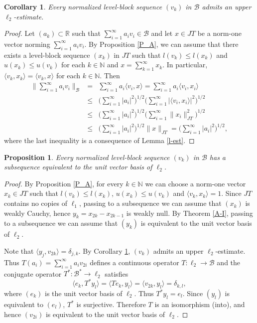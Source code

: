 \documentclass[12pt]{amsart}
\theoremstyle{plain}
\numberwithin{equation}{section}
\newcommand{\N}{\mathbb{N}}
\newcommand{\R}{\mathbb{R}}
\newcommand{\B}{\mathcal{B}}
\newtheorem{proposition}[theorem]{Proposition}
\newtheorem{corollary}[theorem]{Corollary}
\begin{document}
\begin{corollary}\label{u-est}
Every normalized level-block sequence $(v_k)$ in $\B$ admits an upper $\ell_2$-estimate.
\end{corollary}
\begin{proof}
Let $(a_k)\subset \R$ such that $\sum_{i=1}^\infty a_i v_i\in\B$ and let $x\in JT$ be a norm-one vector norming $\sum_{i=1}^\infty a_i v_i$.
By Proposition \ref{P_A}, we can assume that there exists a level-block sequence $(x_k)$ in $JT$ such that $l(v_k)\leq l(x_k)$ and $u(x_k)\leq u(v_k)$ for each $k\in\N$ and $x=\sum_{k=1}^\infty x_k$. In particular, $\langle v_k,x_k\rangle= \langle v_k,x\rangle$ for each $k\in\N$. Then
\begin{eqnarray*}
\Big\|\sum_{i=1}^\infty a_i v_i\Big\|_\B &=&
\sum_{i=1}^\infty a_i \langle v_i,x\rangle=
\sum_{i=1}^\infty a_i \langle v_i,x_i\rangle\\
&\leq&
\Big(\sum_{i=1}^\infty |a_i|^2\Big)^{1/2} \Big(\sum_{i=1}^\infty |\langle v_i,x_i \rangle|^2\Big)^{1/2}\\
&\leq& \Big(\sum_{i=1}^\infty |a_i|^2\Big)^{1/2} \Big(\sum_{i=1}^\infty
\| x_i\|_{JT}^2\Big)^{1/2}\\
&\leq& \Big(\sum_{i=1}^\infty |a_i|^2\Big)^{1/2} \|x\|_{JT} = \Big(\sum_{i=1}^\infty |a_i|^2\Big)^{1/2},
\end{eqnarray*}
where the last inequality is a consequence of Lemma \ref{l-est}.
\end{proof}

\begin{proposition}\label{l2inB}
Every normalized level-block sequence $(v_k)$ in $\B$ has a subsequence equivalent to the unit vector basis of $\ell_2$.
\end{proposition}
\begin{proof}
By Proposition \ref{P_A}, for every $k\in\N$ we can choose a norm-one vector $x_k\in JT$ such that $l(v_k)\leq l(x_k)$, $u(x_k)\leq u(v_k)$ and $\langle v_k,x_k\rangle=1$. Since $JT$ contains no copies of $\ell_1$, passing to a subsequence we can assume that $(x_k)$ is weakly Cauchy, hence $y_k = x_{2k}-x_{2k-1}$ is weakly null. By Theorem \ref{A-I}, passing to a subsequence we can assume that $(y_k)$ is equivalent to the unit vector basis of $\ell_2$.

Note that $\langle y_j,v_{2k}\rangle= \delta_{j,k}$. By Corollary \ref{u-est}, $(v_k)$ admits an upper $\ell_2$-estimate. Thus $T(a_i)=\sum_{i=1}^\infty a_i v_{2i}$ defines a continuous operator $T:\ell_2 \to \B$ and the conjugate operator $T^*:\B^*\to \ell_2$ satisfies
$$
\langle e_k,T^* y_l\rangle= \langle Te_k, y_l \rangle= \langle v_{2k},y_l\rangle= \delta_{k,l},
$$
where $(e_k)$ is the unit vector basis of $\ell_2$. Thus $T^* y_l=e_l$. Since $(y_l)$ is equivalent to $(e_l)$, $T^*$ is surjective. Therefore $T$ is an isomorphism (into), and hence $(v_{2i})$ is equivalent to the unit vector basis of $\ell_2$.
\end{proof}
\end{document}

